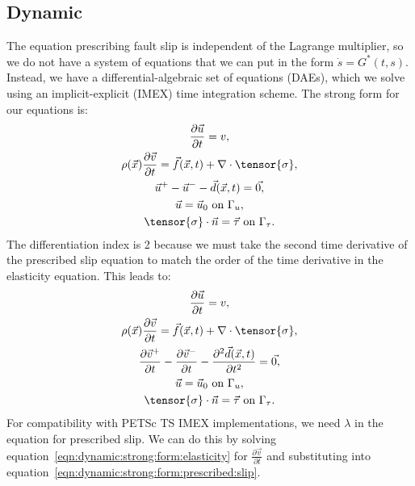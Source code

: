 \subsection{Dynamic}

The equation prescribing fault slip is independent of the Lagrange
multiplier, so we do not have a system of equations that we can put in
the form $\dot{s} = G^*(t,s)$. Instead, we have a
differential-algebraic set of equations (DAEs), which we solve using an
implicit-explicit (IMEX) time integration scheme. The strong form for
our equations is:
\begin{gather}
  \frac{\partial \vec{u}}{\partial t} = v, \\
  \rho(\vec{x}) \frac{\partial \vec{v}}{\partial t} =
  \vec{f}(\vec{x},t) + \nabla \cdot \tensor{\sigma}, \\
  \vec{u}^+ - \vec{u}^- - \vec{d}(\vec{x},t) = \vec{0,} \\
  \vec{u} = \vec{u}_0 \text{ on } \Gamma_u, \\
  \tensor{\sigma} \cdot \vec{n} = \vec{\tau} \text{ on } \Gamma_\tau.
\end{gather}
The differentiation index is 2 because we must take the second time
derivative of the prescribed slip equation to match the order of the
time derivative in the elasticity equation. This leads to:
\begin{gather}
  \frac{\partial \vec{u}}{\partial t} = v, \\
  \label{eqn:dynamic:strong:form:elasticity}
  \rho(\vec{x}) \frac{\partial \vec{v}}{\partial t} =
  \vec{f}(\vec{x},t) + \nabla \cdot \tensor{\sigma}, \\
  \label{eqn:dynamic:strong:form:prescribed:slip}
  \frac{\partial \vec{v}^+}{\partial t} - \frac{\partial \vec{v}^-}{\partial t} -
  \frac{\partial^2 \vec{d}(\vec{x},t)}{\partial t^2} = \vec{0,} \\
  \vec{u} = \vec{u}_0 \text{ on } \Gamma_u, \\
  \tensor{\sigma} \cdot \vec{n} = \vec{\tau} \text{ on } \Gamma_\tau.
\end{gather}
For compatibility with PETSc TS IMEX implementations, we need
$\lambda$ in the equation for prescribed slip. We can do this by
solving equation~\ref{eqn:dynamic:strong:form:elasticity} for
$\frac{\partial \vec{v}}{\partial t}$ and substituting into
equation~\ref{eqn:dynamic:strong:form:prescribed:slip}.

